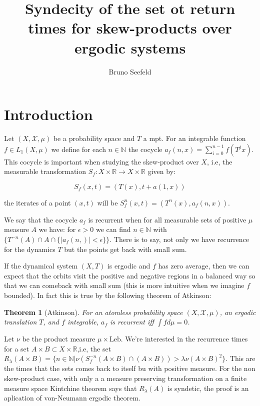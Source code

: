 \documentclass{article}
\title{Syndecity of the set ot return times for skew-products over
ergodic systems}
\author{Bruno Seefeld}
\newtheorem{theorem}{Theorem}[section]
\begin{document}
\maketitle


\begin{abstract}

\end{abstract}


\section{Introduction}

Let $(X,\mathcal{X},\mu)$ be a probability space and $T$ a mpt.
For an integrable function $f\in L_1(X,\mu)$ we define for each $n\in
\mathbb{N}$ the cocycle $a_f(n,x)=\sum_{i=0}^{n-1}f(T^j x)$.
This cocycle is important when studying the skew-product over $X$,
i.e, the measurable transformation $S_f:X\times\mathbb{R}\to X\times\mathbb{R}$
given by:

\begin{equation}
S_f(x,t)=(T(x),t+a(1,x))
\end{equation}


the iterates of a point $(x,t)$ will be $S_f^n(x,t)=(T^n(x),a_f(n,x))$.


We say that the cocycle $a_f$ is recurrent when for all measurable
sets of positive $\mu$ measure $A$ we have: for $\epsilon>0$ we can
find $n\in\mathbb{N}$ with $\{T^{-n}(A)\cap A\cap \{|a_f(n,)|<\epsilon\}\}$.
There is to say, not only we have recurrence for the dynamics $T$ but
the points get back with small sum. 

If the dynamical system $(X,T)$ is ergodic and $f$ has zero average,
then we can expect that the orbits visit the positive and negative 
regions in a balanced way so that we can comeback with small sum (this is
more intuitive when we imagine $f$ bounded). In fact this is true by
the following theorem of Atkinson:


\begin{theorem}[Atkinson]
    For an atomless probability space $(X,\mathcal{X},\mu)$, an ergodic translation $T$,
    and $f$ integrable, $a_f$ is recurrent iff $\int f d\mu=0$. 

\end{theorem}


Let $\nu$ be the product measure $\mu\times \text{Leb}$. We're interested in the recurrence times for a set $A\times B\subset 
X\times \mathbb{R}$,i.e, the set $R_\lambda (A\times B)=\{n\in\mathbb{N}|
\nu(S_f^{-n}(A\times B)\cap(A\times B))>\lambda \nu (A\times B)^2\}$.  This
are the times that the sets comes back to itself bu with positive  measure.
For the non skew-product case, with only a a measure preserving transformation
on a finite measure space Kintchine theorem says that $R_\lambda(A)$
is syndetic, the proof is an aplication of von-Neumann ergodic theorem.
\end{document}
